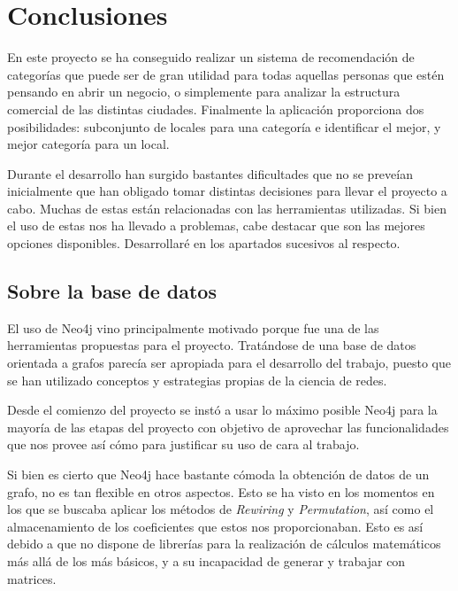 

\section{Conclusiones}

En este proyecto se ha conseguido realizar un sistema de recomendación de categorías que puede ser de gran utilidad para todas aquellas personas que estén pensando en abrir un negocio, o simplemente para analizar la estructura comercial de las distintas ciudades. Finalmente la aplicación proporciona dos posibilidades: subconjunto de locales para una categoría e identificar el mejor, y mejor categoría para un local.


Durante el desarrollo han surgido bastantes dificultades que no se preveían inicialmente que han obligado tomar distintas decisiones para llevar el proyecto a cabo. Muchas de estas están relacionadas con las herramientas utilizadas. Si bien el uso de estas nos ha llevado a problemas, cabe destacar que son las mejores opciones disponibles. Desarrollaré en los apartados sucesivos al respecto.

\subsection{Sobre la base de datos}

El uso de Neo4j vino principalmente motivado porque fue una de las herramientas propuestas para el proyecto. Tratándose de una base de datos orientada a grafos parecía ser apropiada para el desarrollo del trabajo, puesto que se han utilizado conceptos y estrategias propias de la ciencia de redes.

Desde el comienzo del proyecto se instó a usar lo máximo posible Neo4j para la mayoría de las etapas del proyecto con objetivo de aprovechar las funcionalidades que nos provee así cómo para justificar su uso de cara al trabajo.

Si bien es cierto que Neo4j hace bastante cómoda la obtención de datos de un grafo, no es tan flexible en otros aspectos. Esto se ha visto en los momentos en los que se buscaba aplicar los métodos de \textit{Rewiring} y \textit{Permutation}, así como el almacenamiento de los coeficientes que estos nos proporcionaban. Esto es así debido a que no dispone de librerías para la realización de cálculos matemáticos más allá de los más básicos, y a su incapacidad de generar y trabajar con matrices.

